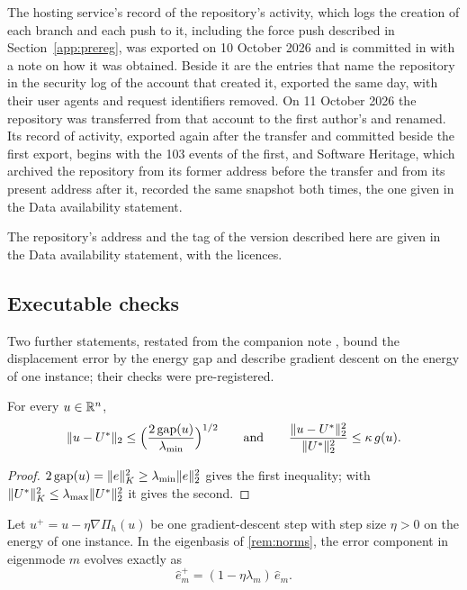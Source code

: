 The hosting service's record of the repository's activity, which logs the creation of each
branch and each push to it, including the force push described in Section~\ref{app:prereg},
was exported on 10 October 2026 and is committed in  with a note
on how it was obtained. Beside it are the entries that name the repository in the security
log of the account that created it, exported the same day, with their user agents and
request identifiers removed. On 11 October 2026 the repository was transferred from that
account to the first author's and renamed. Its record of activity, exported again after the
transfer and committed beside the first export, begins with the 103 events of the first, and
Software Heritage, which archived the repository from its former address before the transfer
and from its present address after it, recorded the same snapshot both times, the one given
in the Data availability statement.

The repository's address and the tag of the version described here are given in the Data
availability statement, with the licences.

\subsection{Executable checks}\label{app:repro:checks}

Two further statements, restated from the companion note \cite{CaoSong2026}, bound the
displacement error by the energy gap and describe gradient descent on the energy of one
instance; their checks were pre-registered.

\begin{lemma}[Conditioning]\label{lem:cond}
For every $u\in\mathbb{R}^{n}$,
\begin{equation}
\lVert u-U^{\ast}\rVert_2 \le \Bigl(\frac{2\operatorname{gap}(u)}{\lambda_{\min}}\Bigr)^{1/2}
\qquad\text{and}\qquad
\frac{\lVert u-U^{\ast}\rVert_2^{2}}{\lVert U^{\ast}\rVert_2^{2}} \le \kappa\, g(u).
\label{eq:cond}
\end{equation}
\end{lemma}

\begin{proof}
$2\operatorname{gap}(u)=\lVert e\rVert_K^2\ge\lambda_{\min}\lVert e\rVert_2^2$ gives the first inequality; with
$\lVert U^{\ast}\rVert_K^2\le\lambda_{\max}\lVert U^{\ast}\rVert_2^2$ it gives the second.
\end{proof}

\begin{corollary}\label{cor:modes}
Let $u^{+}=u-\eta\nabla\Pi_h(u)$ be one gradient-descent step with step size $\eta>0$ on the
energy of one instance. In the eigenbasis of \cref{rem:norms}, the error component in
eigenmode $m$ evolves exactly as
\begin{equation}
\hat e_m^{+} = (1-\eta\lambda_m)\,\hat e_m .
\label{eq:modes}
\end{equation}
\end{corollary}

